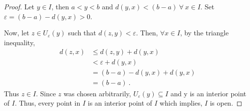 \begin{questions}


\begin{solution}
  \begin{proof}
 Let $y \in I$, then $a < y < b$ and $d(y,x) < (b-a) ~\forall~x \in I$. Set $\varepsilon = (b-a) - d(y,x) > 0$.
 
 Now, let $z \in U_{\varepsilon}(y)$ such that $d(z,y) < \varepsilon$.
 Then, $\forall x \in I$, by the triangle inequality,
 \begin{align*}
 d(z,x) &\leq d(z,y) + d(y,x) \\
 & < \varepsilon + d(y,x) \\
 & = (b-a) - d(y,x) + d(y,x) \\
 & = (b-a) ~.
 \end{align*}
Thus $z \in I$. Since $z$ was chosen arbitrarily, $U_{\varepsilon}(y) \subseteq I$ and y is an interior point of $I$. Thus, every point in $I$ is an interior point of $I$ which implies, $I$ is open.
  \end{proof}
\end{solution}


\end{questions}